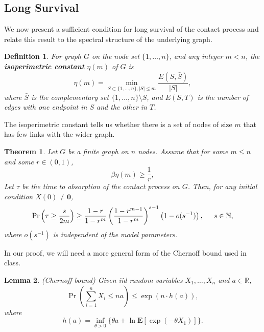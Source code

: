 \documentclass[11pt]{article}
\newtheorem{theorem}{Theorem}[section]
\newtheorem{lemma}[theorem]{Lemma}
\newtheorem{definition}{Definition}[section]
\begin{document}
\subsection{Long Survival}

We now present a sufficient condition for long survival of the contact process and relate this result to the spectral structure of the underlying graph.

\begin{definition}
For graph $G$ on the node set $\{1,\ldots,n\}$, and any integer $m < n$, the \textbf{isoperimetric constant} $\eta(m)$ of $G$ is
$$\eta(m) = \min_{S\subset \{1,\ldots,n\},|S|\leq m} \frac{E(S,\bar S)}{|S|},$$
where $\bar S$ is the complementary set $\{1,\ldots,n\} \setminus S$, and $E(S,T)$ is the number of edges with one endpoint in $S$ and the other in $T$.
\end{definition}

The isoperimetric constant tells us whether there is a set of nodes of size $m$ that has few links with the wider graph.

\begin{theorem} \label{thm:long_survival}
Let $G$ be a finite graph on $n$ nodes. Assume that for some $m\leq n$ and some $r\in(0,1)$,
$$\beta \eta(m) \geq \frac{1}{r},$$
Let $\tau$ be the time to absorption of the contact process on $G$. Then, for any initial condition $X(0)\neq \mathbf{0}$,
$$\Pr \left(\tau \geq \frac{s}{2m} \right) \geq \frac{1-r}{1-r^m} \left( \frac{1-r^{m-1}}{1-r^m} \right)^{s-1} \left(1-o(s^{-1}) \right), \hspace{0.5cm} s \in\mathbb{N},$$
where $o(s^{-1})$ is independent of the model parameters.
\end{theorem}

In our proof, we will need a more general form of the Chernoff bound used in class.
\begin{lemma} \label{lemma:chernoff}
(Chernoff bound) Given iid random variables $X_1,\ldots,X_n$ and $a\in \mathbb{R}$,
$$\Pr\left(\sum_{i=1}^n X_i \leq na \right) \leq \exp(n \cdot h(a)),$$
where
$$h(a) = \inf_{\theta > 0} \{ \theta a + \ln \mathbf{E}[\exp(-\theta X_1)]\}.$$
\end{lemma}
\end{document}
